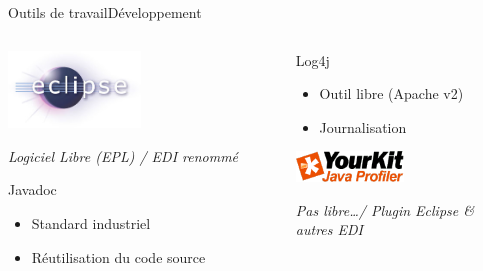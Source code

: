 \begin{frame}{Outils de travail}{Développement}
\begin{columns}[t]
  \begin{column}[l]{0.5\textwidth}
		\begin{center}
			\includegraphics[width=0.5\textwidth]{img/outils/eclipse_logo}\\
			\begin{small}\textit{Logiciel Libre (EPL) / EDI renommé}\end{small}
		\end{center}
\begin{block}{Javadoc}
	\begin{itemize}
	\item Standard industriel
	\item Réutilisation du code source
	\end{itemize}
\end{block}
\end{column}
\begin{column}[l]{0.5\textwidth}
\begin{block}{Log4j}
	\begin{itemize}
	\item Outil libre (Apache v2)
	\item Journalisation
	\end{itemize}
\end{block}
\begin{block}{}
		\begin{center}
			\includegraphics[width=0.5\textwidth]{img/outils/yourkit_logo}\\
			\begin{small}\textit{Pas libre\ldots / Plugin Eclipse \& autres EDI}\end{small}
		\end{center}
\end{block}
\end{column}
\end{columns}
\end{frame}